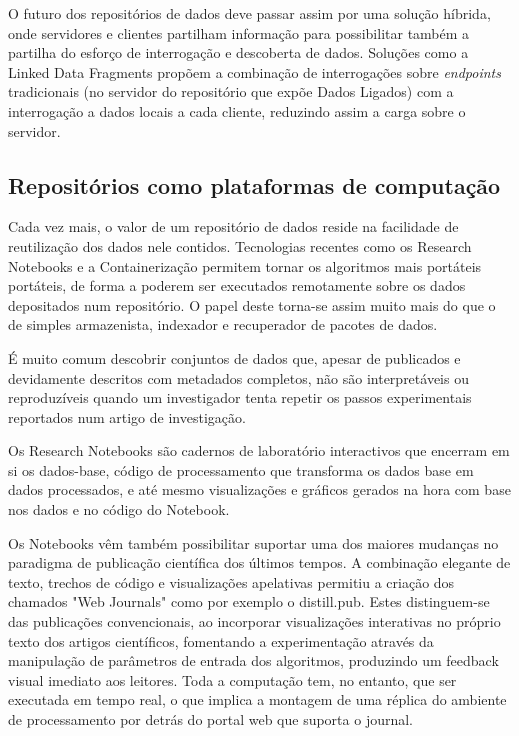 \documentclass[sigconf,nonacm]{acmart}
\begin{document}
O futuro dos repositórios de dados deve passar assim por uma solução híbrida, onde servidores e clientes partilham informação para possibilitar também a partilha do esforço de interrogação e descoberta de dados. Soluções como a Linked Data Fragments\cite{VERBORGH2016184} propõem a combinação de interrogações sobre \textit{endpoints} tradicionais (no servidor do repositório que expõe Dados Ligados) com a interrogação a dados locais a cada cliente, reduzindo assim a carga sobre o servidor.

\subsection{Repositórios como plataformas de computação}

Cada vez mais, o valor de um repositório de dados reside na facilidade de reutilização dos dados nele contidos. Tecnologias recentes como os Research Notebooks e a Containerização permitem tornar os algoritmos mais portáteis portáteis, de forma a poderem ser executados remotamente sobre os dados depositados num repositório. O papel deste torna-se assim muito mais do que o de simples armazenista, indexador e recuperador de pacotes de dados.

É muito comum descobrir conjuntos de dados que, apesar de publicados e devidamente descritos com metadados completos, não são interpretáveis ou reproduzíveis quando um investigador tenta repetir os passos experimentais reportados num artigo de investigação\cite{}. 

Os Research Notebooks são cadernos de laboratório interactivos que encerram em si os dados-base, código de processamento que transforma os dados base em dados processados, e até mesmo visualizações e gráficos gerados na hora com base nos dados e no código do Notebook.

Os Notebooks vêm também possibilitar suportar uma dos maiores mudanças no paradigma de publicação científica dos últimos tempos. A combinação elegante de texto, trechos de código e visualizações apelativas permitiu a criação dos chamados "Web Journals" como por exemplo o distill.pub. Estes distinguem-se das publicações convencionais, ao incorporar visualizações interativas no próprio texto dos artigos científicos, fomentando a experimentação através da manipulação de parâmetros de entrada dos algoritmos, produzindo um feedback visual imediato aos leitores. Toda a computação tem, no entanto, que ser executada em tempo real, o que implica a montagem de uma réplica do ambiente de processamento por detrás do portal web que suporta o journal.
\end{document}
